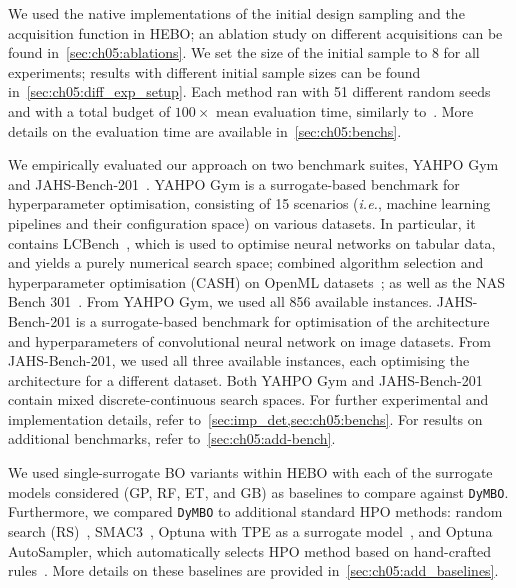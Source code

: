 We used the native implementations of the initial design sampling and the acquisition function in HEBO; an ablation study on different acquisitions can be found in~\cref{sec:ch05:ablations}.
We set the size of the initial sample to 8 for all experiments; results with different initial sample sizes can be found in~\cref{sec:ch05:diff_exp_setup}.
Each method ran with 51 different random seeds and with a total budget of $100 \times$ mean evaluation time, similarly to~\citet{EggEtAl21b}. 
More details on the evaluation time are available in~\cref{sec:ch05:benchs}. %


We empirically evaluated our approach on two benchmark suites, YAHPO Gym~\citep{PfiEtAl22} and JAHS-Bench-201~\citep{BanEtAl22}.
YAHPO Gym is a surrogate-based benchmark for hyperparameter optimisation, consisting of 15 scenarios (\emph{i.e.}, machine learning pipelines and their configuration space) on various datasets.
In particular, it contains LCBench~\citep{ZimEtAl21b}, which is used to optimise neural networks on tabular data, and yields a purely numerical search space; combined algorithm selection and hyperparameter optimisation (CASH) on OpenML datasets~\citep{BinEtAl20,FalEtAl18}; as well as the NAS Bench 301~\citep{ZelEtAl22}. 
From YAHPO Gym, we used all 856 available instances.
JAHS-Bench-201 is a surrogate-based benchmark for optimisation of the architecture and hyperparameters of convolutional neural network on image datasets. 
From JAHS-Bench-201, we used all three available instances, each optimising the architecture for a different dataset.
Both YAHPO Gym and JAHS-Bench-201 contain mixed discrete-continuous search spaces. 
For further experimental and implementation details, refer to~\cref{sec:imp_det,sec:ch05:benchs}.
For results on additional benchmarks, refer to~\cref{sec:ch05:add-bench}.


We used single-surrogate BO variants within HEBO with each of the surrogate models considered (GP, RF, ET, and GB) as baselines to compare against \texttt{DyMBO}. 
Furthermore, we compared \texttt{DyMBO} to additional standard HPO methods: random search (RS)~\citep{BerEtAl11}, SMAC3~\citep{LinEtAl22b, HutEtAl11}, Optuna with TPE as a surrogate model~\citep{BerEtAl11,AkiEtAl19}, and Optuna AutoSampler, which automatically selects HPO method based on hand-crafted rules~\citep{Ozaki24}.
More details on these baselines are provided in~\cref{sec:ch05:add_baselines}.


